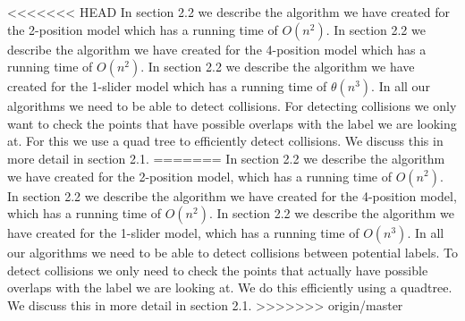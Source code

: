 \documentclass[crop=false,a4paper,oneside,11pt]{standalone}
\begin{document}
<<<<<<< HEAD
In section 2.2 we describe the algorithm we have created for the 2-position model which has a running time of $O(n^2)$. In section 2.2 we describe the algorithm we have created for the 4-position model which has a running time of $O(n^2)$. In section 2.2 we describe the algorithm we have created for the 1-slider model which has a running time of $\theta(n^3)$. In all our algorithms we need to be able to detect collisions. For detecting collisions we only want to check the points that have possible overlaps with the label we are looking at. For this we use a quad tree to efficiently detect collisions. We discuss this in more detail in section 2.1.
=======
In section 2.2 we describe the algorithm we have created for the 2-position model, which has a running time of $O(n^2)$. In section 2.2 we describe the algorithm we have created for the 4-position model, which has a running time of $O(n^2)$. In section 2.2 we describe the algorithm we have created for the 1-slider model, which has a running time of $O(n^3)$. In all our algorithms we need to be able to detect collisions between potential labels. To detect collisions we only need to check the points that actually have possible overlaps with the label we are looking at. We do this efficiently using a quadtree. We discuss this in more detail in section 2.1.
>>>>>>> origin/master
\end{document}
